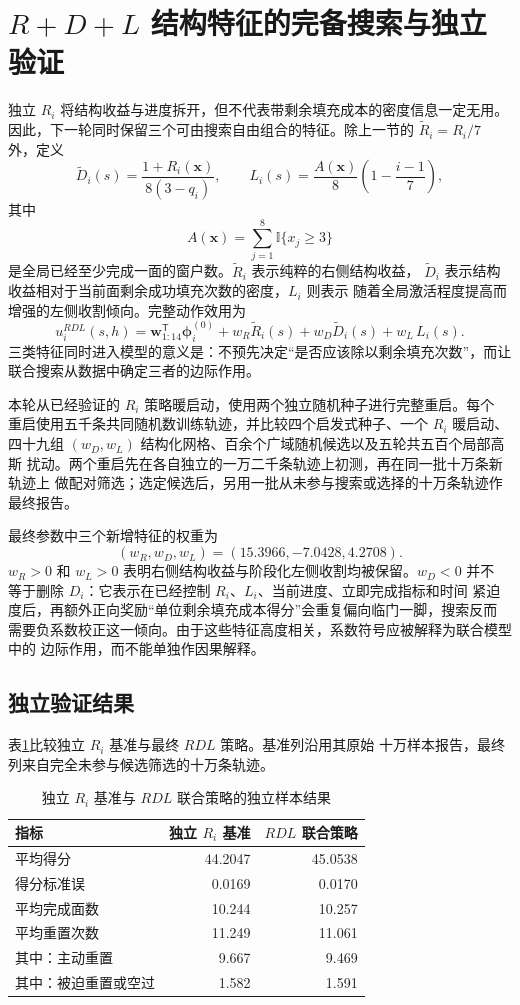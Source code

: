 \documentclass[UTF8,11pt,openany]{ctexrep}
\newcommand{\ind}{\mathbb{I}}
\newcommand{\xvec}{\boldsymbol{x}}
\begin{document}
\section{\texorpdfstring{$R+D+L$}{R+D+L} 结构特征的完备搜索与独立验证}

独立 $R_i$ 将结构收益与进度拆开，但不代表带剩余填充成本的密度信息一定无用。
因此，下一轮同时保留三个可由搜索自由组合的特征。除上一节的
$\widetilde R_i=R_i/7$ 外，定义
\[
\widetilde D_i(s)
=\frac{1+R_i(\xvec)}{8(3-q_i)},
\qquad
L_i(s)
=\frac{A(\xvec)}{8}\left(1-\frac{i-1}{7}\right),
\]
其中
\[
A(\xvec)=\sum_{j=1}^{8}\ind\{x_j\ge3\}
\]
是全局已经至少完成一面的窗户数。$\widetilde R_i$ 表示纯粹的右侧结构收益，
$\widetilde D_i$ 表示结构收益相对于当前面剩余成功填充次数的密度，$L_i$ 则表示
随着全局激活程度提高而增强的左侧收割倾向。完整动作效用为
\[
u_i^{RDL}(s,h)
=\boldsymbol{w}_{1:14}^{\mathsf T}\boldsymbol{\phi}^{(0)}_i
+w_R\widetilde R_i(s)+w_D\widetilde D_i(s)+w_L\,L_i(s).
\]
三类特征同时进入模型的意义是：不预先决定“是否应该除以剩余填充次数”，而让
联合搜索从数据中确定三者的边际作用。

本轮从已经验证的 $R_i$ 策略暖启动，使用两个独立随机种子进行完整重启。每个
重启使用五千条共同随机数训练轨迹，并比较四个启发式种子、一个 $R_i$ 暖启动、
四十九组 $(w_D,w_L)$ 结构化网格、百余个广域随机候选以及五轮共五百个局部高斯
扰动。两个重启先在各自独立的一万二千条轨迹上初测，再在同一批十万条新轨迹上
做配对筛选；选定候选后，另用一批从未参与搜索或选择的十万条轨迹作最终报告。

最终参数中三个新增特征的权重为
\[
(w_R,w_D,w_L)=(15.3966,-7.0428,4.2708).
\]
$w_R>0$ 和 $w_L>0$ 表明右侧结构收益与阶段化左侧收割均被保留。$w_D<0$ 并不
等于删除 $D_i$：它表示在已经控制 $R_i$、$L_i$、当前进度、立即完成指标和时间
紧迫度后，再额外正向奖励“单位剩余填充成本得分”会重复偏向临门一脚，搜索反而
需要负系数校正这一倾向。由于这些特征高度相关，系数符号应被解释为联合模型中的
边际作用，而不能单独作因果解释。

\subsection{独立验证结果}

表\ref{tab:rdl-overall}比较独立 $R_i$ 基准与最终 $RDL$ 策略。基准列沿用其原始
十万样本报告，最终列来自完全未参与候选筛选的十万条轨迹。

\begin{table}[htbp]
\centering
\caption{独立 $R_i$ 基准与 $RDL$ 联合策略的独立样本结果}
\label{tab:rdl-overall}
\begin{tabular}{lrr}
\toprule
指标 & 独立 $R_i$ 基准 & $RDL$ 联合策略 \\
\midrule
平均得分 & 44.2047 & 45.0538 \\
得分标准误 & 0.0169 & 0.0170 \\
平均完成面数 & 10.244 & 10.257 \\
平均重置次数 & 11.249 & 11.061 \\
其中：主动重置 & 9.667 & 9.469 \\
其中：被迫重置或空过 & 1.582 & 1.591 \\
\bottomrule
\end{tabular}
\end{table}
\end{document}
